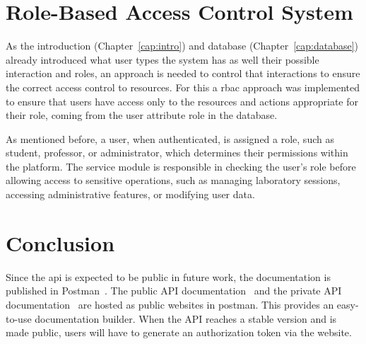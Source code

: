 \section{Role-Based Access Control System}
As the introduction (Chapter~\ref{cap:intro}) and database (Chapter~\ref{cap:database}) already introduced what user types the system has as well their possible interaction and roles, an approach is needed to control that interactions to ensure the correct access control to resources. For this a \ac{rbac} approach was implemented to ensure that users have access only to the resources and actions appropriate for their role, coming from the user attribute role in the database. 

As mentioned before, a user, when authenticated, is assigned a role, such as student, professor, or administrator, which determines their permissions within the platform. The service module is responsible in checking the user's role before allowing access to sensitive operations, such as managing laboratory sessions, accessing administrative features, or modifying user data. 

\section{Conclusion}

Since the \acs{api} is expected to be public in future work, the documentation is published in Postman~\cite{postman}. The public API documentation~\cite{public-api-documentation} and the private API documentation~\cite{private-api-documentation} are hosted as public websites in postman. This provides an easy-to-use documentation builder. When the API reaches a stable version and is made public, users will have to generate an authorization token via the website. 